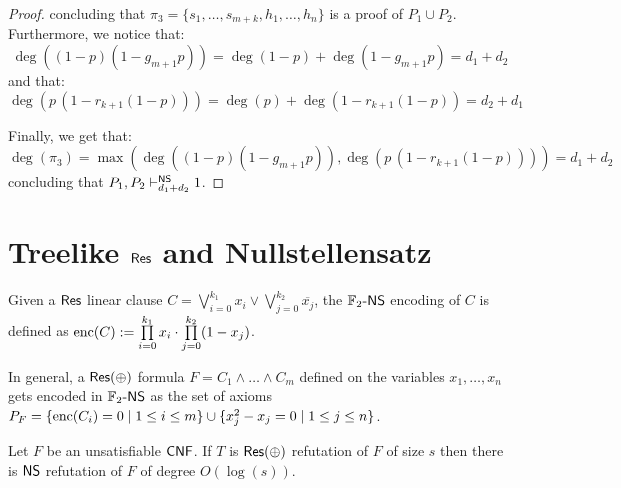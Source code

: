 \begin{proof}
    concluding that $\pi_3 = \{s_1, \ldots, s_{m+k}, h_1, \ldots, h_n\}$ is a proof of $P_1 \cup P_2$. Furthermore, we notice that:
    \[\deg((1-p)(1-g_{m+1}p)) = \deg(1-p) + \deg(1-g_{m+1}p) = d_1 + d_2\]
    and that:
    \[\deg(p\,(1-r_{k+1}(1-p))) = \deg(p) + \deg(1-r_{k+1}(1-p)) = d_2 + d_1\]

    Finally, we get that:
    \[\deg(\pi_3) = \max(\deg((1-p)(1-g_{m+1}p)), \deg(p\,(1-r_{k+1}(1-p)))) = d_1 + d_2\]
    concluding that $P_1, P_2 \vdash_{d_1+d_2}^{\mathsf{NS}} 1$.

\end{proof}

\newpage

\section{Treelike $\mathsf{Res}$ and Nullstellensatz}

\begin{definition}
    Given a $\mathsf{Res}$ linear clause $C = \bigvee\limits_{i = 0}^{k_1} x_i \lor  \bigvee\limits_{j = 0}^{k_2} \overline{x_j}$, the $\mathbb{F}_2\text{-}\mathsf{NS}$ encoding of $C$ is defined as $\mathrm{enc}(C) := \prod\limits_{i = 0}^{k_1} x_i \cdot \prod\limits_{j = 0}^{k_2} (1-x_j)$.
    
    In general, a $\mathsf{Res(\oplus)}$ formula $F = C_1 \land \ldots \land C_m$ defined on the variables $x_1, \ldots, x_n$ gets encoded in $\mathbb{F}_2\text{-}\mathsf{NS}$ as the set of axioms $P_F = \{\mathrm{enc}(C_i) = 0 \mid 1 \leq i \leq m\} \cup \{x_j^2-x_j = 0 \mid 1 \leq j \leq n\}$.
\end{definition}

\begin{theorem}
    Let $F$ be an unsatisfiable $\mathsf{CNF}$. If $T$ is $\mathsf{Res(\oplus)}$ refutation of $F$ of size $s$ then there is $\mathsf{NS}$ refutation of $F$ of degree $O(\log(s))$.
\end{theorem}

